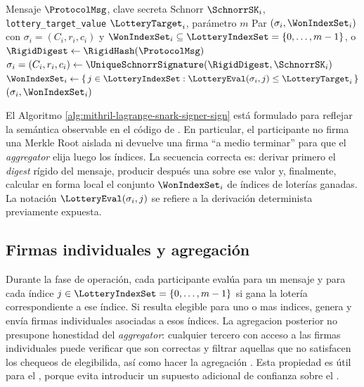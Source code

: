 \begin{algorithm}[ht]
	\caption{Firma de un participante con chequeo de lotería en \Lagrange}
	\label{alg:mithril-lagrange-snark-signer-sign}
	\begin{algorithmic}[1]
		\Require Mensaje $\ProtocolMsg$, clave secreta Schnorr $\SchnorrSK_i$, \texttt{lottery\_target\_value} $\LotteryTarget_i$, parámetro $m$
		\Ensure Par $(\sigma_i, \WonIndexSet_i)$ con $\sigma_i = (C_i,r_i,c_i)$ y $\WonIndexSet_i \subseteq \LotteryIndexSet=\{0,\ldots,m-1\}$, o \LotteryLost
		\State $\RigidDigest \gets \RigidHash(\ProtocolMsg)$ \Comment{\ProtocolMessageComputeHash}
		\State $\sigma_i = (C_i, r_i, c_i) \gets \UniqueSchnorrSignature(\RigidDigest,\SchnorrSK_i)$
		\State $\WonIndexSet_i \gets \{\, j \in \LotteryIndexSet : \LotteryEval(\sigma_i, j) \leq \LotteryTarget_i \,\}$
			\State \Return \LotteryLost
		\Else
			\State \Return $(\sigma_i, \WonIndexSet_i)$
		\EndIf
	\end{algorithmic}
\end{algorithm}

El Algoritmo \ref{alg:mithril-lagrange-snark-signer-sign} está formulado para reflejar la semántica observable en el código de \Mithril. En particular, el participante no firma una Merkle Root aislada ni devuelve una firma ``a medio terminar'' para que el \textit{aggregator} elija luego los índices. La secuencia correcta es: derivar primero el \textit{digest} rígido \RigidDigest del mensaje, producir después una \UniqueSchnorrSignature sobre ese valor y, finalmente, calcular en forma local el conjunto $\WonIndexSet_i$ de índices de loterías ganadas. La notación \(\LotteryEval(\sigma_i, j)\) se refiere a la derivación determinista previamente expuesta.

\subsection{Firmas individuales y agregación}

Durante la fase de operación, cada participante evalúa para un mensaje \ProtocolMsg y para cada índice $j \in \LotteryIndexSet=\{0,\ldots,m-1\}$ si gana la lotería correspondiente a ese índice. Si resulta elegible para uno o mas indices, genera y envía firmas individuales asociadas a esos índices. La agregacion posterior no presupone honestidad del \textit{aggregator}: cualquier tercero con acceso a las firmas individuales puede verificar que son correctas y filtrar aquellas que no satisfacen los chequeos de elegibilida, así como hacer la agregación \cite{MithrilDocsProtocol}. Esta propiedad es útil para el \zkBridge, porque evita introducir un supuesto adicional de confianza sobre el \MithrilAggregator.

